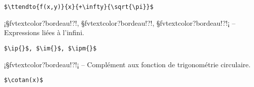 \documentclass[11pt,a4paper,rgb]{report}
\begin{document}
\setlength{\leftskip}{.75cm}%
\setlength{\textwidth}{17.25cm}%

\colorbox{blue!15}{}
\hfill
\begin{minipage}{.65\textwidth}
	\begin{lstlisting}[linewidth=\textwidth, language={[LaTeX]TeX}]
	$\ttendto{f(x,y)}{x}{+\infty}{\sqrt{\pi}}$
	\end{lstlisting}
\end{minipage}

\setlength{\leftskip}{0pt}
\setlength{\textwidth}{18cm}%


\vspace*{.75cm}

\inCodeStub¡§fvtextcolor?bordeau!?\ip{}!, §fvtextcolor?bordeau!?\im{}!, §fvtextcolor?bordeau!?\ipm{}!¡ -- Expressions liées à l'infini.

\setlength{\leftskip}{.75cm}%
\setlength{\textwidth}{17.25cm}%

\colorbox{blue!15}{}
\hfill
\begin{minipage}{.65\textwidth}
	\begin{lstlisting}[linewidth=\textwidth, language={[LaTeX]TeX}]
	$\ip{}$, $\im{}$, $\ipm{}$
	\end{lstlisting}
\end{minipage}

\setlength{\leftskip}{0pt}
\setlength{\textwidth}{18cm}%


\vspace*{.75cm}

\inCodeStub¡§fvtextcolor?bordeau!?\cotan{}!¡ -- Complément aux fonction de trigonométrie circulaire.

\setlength{\leftskip}{.75cm}%
\setlength{\textwidth}{17.25cm}%

\colorbox{blue!15}{}
\hfill
\begin{minipage}{.65\textwidth}
	\begin{lstlisting}[linewidth=\textwidth, language={[LaTeX]TeX}]
	$\cotan(x)$
	\end{lstlisting}
\end{minipage}

\setlength{\leftskip}{0pt}
\setlength{\textwidth}{18cm}%



\vspace*{.75cm}
\end{document}
